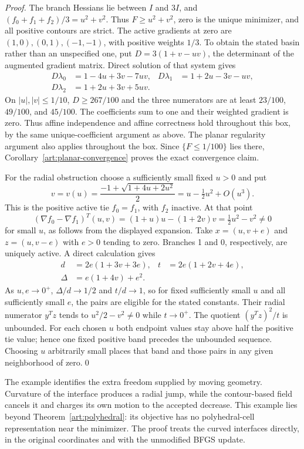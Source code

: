 \begin{proof}
The branch Hessians lie between $I$ and $3I$, and
$(f_0+f_1+f_2)/3=u^2+v^2$. Thus $F\ge u^2+v^2$, zero is the unique
minimizer, and all positive contours are strict. The active gradients at
zero are $(1,0),(0,1),(-1,-1)$, with positive weights $1/3$.
To obtain the stated basin rather than an unspecified one, put
$D=3(1+v-uv)$, the determinant of the augmented gradient matrix.
Direct solution of that system gives
\[
 \begin{aligned}
 D\lambda_0&=1-4u+3v-7uv,&
 D\lambda_1&=1+2u-3v-uv,\\
 D\lambda_2&=1+2u+3v+5uv.&&
 \end{aligned}
\]
On $|u|,|v|\le1/10$, $D\ge267/100$ and the three numerators are at least
$23/100$, $49/100$, and $45/100$. The coefficients sum to one and their
weighted gradient is zero. Thus affine independence and affine correctness
hold throughout this box, by the same unique-coefficient argument as above.
The planar regularity argument also applies throughout the box. Since
$\{F\le1/100\}$ lies there, Corollary~\ref{art:planar-convergence} proves
the exact convergence claim.

For the radial obstruction choose a sufficiently small fixed $u>0$ and put
\[
 v=v(u)=\frac{-1+\sqrt{1+4u+2u^2}}2
       =u-\tfrac12u^2+O(u^3).
\]
This is the positive active tie $f_0=f_1$, with $f_2$ inactive. At that point
\[
 (\nabla f_0-\nabla f_1)^T(u,v)
 =(1+u)u-(1+2v)v=\tfrac12u^2-v^2\ne0
\]
for small $u$, as follows from the displayed expansion. Take
$x=(u,v+e)$ and $z=(u,v-e)$ with $e>0$ tending to zero. Branches 1 and 0,
respectively, are uniquely active. A direct calculation gives
\[
 \begin{aligned}
 d&=2e(1+3v+3e),&t&=2e(1+2v+4e),\\
 \Delta&=e(1+4v)+e^2.&&
 \end{aligned}
\]
As $u,e\to0^+$, $\Delta/d\to1/2$ and $t/d\to1$, so for fixed sufficiently
small $u$ and all sufficiently small $e$, the pairs are eligible for the
stated constants. Their radial numerator $y^Tz$ tends to
$u^2/2-v^2\ne0$ while $t\to0^+$. The quotient $(y^Tz)^2/t$ is unbounded.
For each chosen $u$ both endpoint values stay above half the positive tie
value; hence one fixed positive band precedes the unbounded sequence.
Choosing $u$ arbitrarily small places that band and those pairs in any
given neighborhood of zero.\qed
\end{proof}

The example identifies the extra freedom supplied by moving geometry.
Curvature of the interface produces a radial jump, while the contour-based
field cancels it and charges its own motion to the accepted decrease.
This example lies beyond Theorem~\ref{art:polyhedral}: its objective has no
polyhedral-cell representation near the minimizer. The proof treats the
curved interfaces directly, in the original coordinates and with the
unmodified BFGS update.

